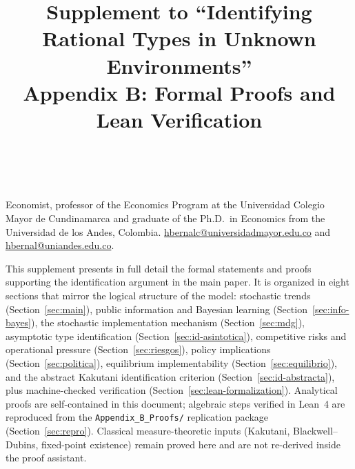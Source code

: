 \documentclass[ecta,nameyear,final,supplement]{econsocart}
\numberwithin{equation}{section}
\numberwithin{table}{section}
\theoremstyle{definition}
\begin{document}
\begin{frontmatter}

\title{Supplement to ``Identifying Rational Types in Unknown Environments''\\
Appendix B: Formal Proofs and Lean Verification}

\begin{aug}
\author[add1,add2]{~}
\address[add1]{%
,
}
\address[add2]{%
,
}
\end{aug}

\begin{funding}
Economist, professor of the Economics Program at the Universidad Colegio
Mayor de Cundinamarca and graduate of the Ph.D.\ in Economics from the
Universidad de los Andes, Colombia.
\href{mailto:hbernalc@universidadmayor.edu.co}{hbernalc@universidadmayor.edu.co}
and \href{mailto:hbernal@uniandes.edu.co}{hbernal@uniandes.edu.co}.
\end{funding}

\end{frontmatter}

\noindent
This supplement presents in full detail the formal statements and proofs
supporting the identification argument in the main paper. It is organized in
eight sections that mirror the logical structure of the model: stochastic
trends (Section~\ref{sec:main}), public information and Bayesian learning
(Section~\ref{sec:info-bayes}), the stochastic implementation mechanism
(Section~\ref{sec:mdg}), asymptotic type identification
(Section~\ref{sec:id-asintotica}), competitive risks and operational pressure
(Section~\ref{sec:riesgos}), policy implications (Section~\ref{sec:politica}),
equilibrium implementability (Section~\ref{sec:equilibrio}), and the abstract
Kakutani identification criterion (Section~\ref{sec:id-abstracta}), plus
machine-checked verification (Section~\ref{sec:lean-formalization}). Analytical
proofs are self-contained in this document; algebraic steps verified in Lean~4
are reproduced from the \texttt{Appendix\_B\_Proofs/} replication package
(Section~\ref{sec:repro}). Classical measure-theoretic inputs (Kakutani,
Blackwell--Dubins, fixed-point existence) remain proved here and are not
re-derived inside the proof assistant.

\end{document}
